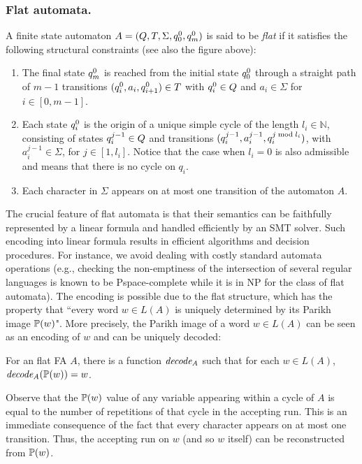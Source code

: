 \documentclass[sigplan,screen]{acmart}
\begin{document}
	
\subsubsection*{Flat automata.} 
A finite state automaton  
$A = (Q,T,\Sigma,q_{0}^{0},q_{m}^{0})$ is said to be \emph{flat} if it satisfies the following structural constraints (see also the figure above):
\begin{enumerate}
	\item The final state $q_{m}^{0}$ is reached from  the initial state $q_{0}^{0}$ through a straight path of $m-1$ transitions $(q_{i}^{0},a_i,q_{i+1}^{0}) \in T$ with $q_{i}^{0} \in Q$ and $a_i \in \Sigma$ for $i\in[0,m-1]$. 
	\item  
Each state $q_{i}^{0}$ is the origin of a unique simple cycle of the length $l_i\in\mathbb{N}$, consisting of states $q_{i}^{j-1} \in Q$ and transitions $(q_{i}^{j-1}, a_{i}^{j-1}, q_{i}^{j \bmod l_i})$, with $a_{i}^{j-1} \in \Sigma$, for $j\in [1,l_i]$. 
Notice that the case when $l_i = 0$ is also admissible and means that there is no cycle on $q_i$.
	\item Each character in $\Sigma$ appears on at most one transition of the automaton $A$. 
\end{enumerate} 

The crucial feature of flat automata is that their semantics can be faithfully represented by a linear formula and handled efficiently by an SMT solver. Such encoding into linear formula results in efficient algorithms and decision procedures. For instance, we avoid dealing with costly standard automata operations (e.g., checking  the non-emptiness of the intersection of several regular languages is known to be {\sc Pspace}-complete while it is in {\sc NP} for the class of flat automata).
The encoding is possible due to the flat structure, which has the property that 
``every word $w\in L(A)$ is uniquely determined by its Parikh image $\mathbb{P}{(w)}$". 
More precisely, the Parikh image of a word $w\in L(A)$ can be seen as an encoding of $w$ and can be uniquely decoded:


\begin{lemma}\label{lemma:decoding}
For an flat FA $A$, there is a function $\mathit{decode_{A}}$ such that for each $w\in L(A)$, $\mathit{decode_{A}}(\mathbb{P}{(w)}) = w$. 
\end{lemma}
%
Observe that the $\mathbb{P}{(w)}$ value of any variable appearing within  a cycle of $A$ is equal to the number of repetitions of that cycle in the accepting run. This is an immediate consequence of the fact that 
 every character appears on at most one transition. Thus, the accepting run on $w$ (and so $w$ itself) can be reconstructed from $\mathbb{P}{(w)}$.  
 
\end{document}
